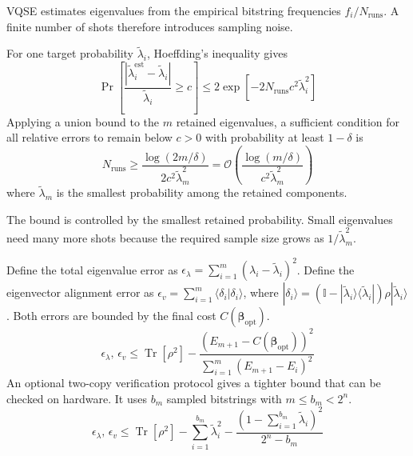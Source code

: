 VQSE estimates eigenvalues from the empirical bitstring frequencies $f_i/N_{\text{runs}}$.  A finite number of shots therefore introduces sampling noise.

\begin{theorem}
    For one target probability $\tilde{\lambda}_i$, Hoeffding's inequality gives
    \begin{equation}
        \Pr\!\left[
            \frac{|\tilde{\lambda}_i^{\mathrm{est}}-\tilde{\lambda}_i|}{\tilde{\lambda}_i}
            \geq c\right]
        \leq 2\exp\!\left[-2N_{\mathrm{runs}}c^2\tilde{\lambda}_i^2\right]
    \end{equation}
    Applying a union bound to the $m$ retained eigenvalues, a sufficient condition for all relative errors to remain below $c>0$ with probability at least $1-\delta$ is
    \begin{equation}
        N_{\text{runs}}
        \geq\frac{\log(2m/\delta)}{2c^2\tilde{\lambda}_m^2}
        =\mathcal{O}\!\left(\frac{\log(m/\delta)}{c^2\tilde{\lambda}_m^2}\right)
        \label{eq:shot_scaling}
    \end{equation}
    where $\tilde{\lambda}_m$ is the smallest probability among the retained components.
\end{theorem}

The bound is controlled by the smallest retained probability.  Small eigenvalues need many more shots because the required sample size grows as $1/\tilde{\lambda}_m^2$.

\begin{theorem}
    Define the total eigenvalue error as $\epsilon_\lambda=\sum_{i=1}^m(\lambda_i-\tilde{\lambda}_i)^2$.  Define the eigenvector alignment error as $\epsilon_v=\sum_{i=1}^m\langle\delta_i|\delta_i\rangle$, where $|\delta_i\rangle=(\mathbb{I}-|\tilde{\lambda}_i\rangle\langle\tilde{\lambda}_i|)\rho|\tilde{\lambda}_i\rangle$.  Both errors are bounded by the final cost $C(\boldsymbol{\beta}_{\mathrm{opt}})$.
    \begin{equation}
        \epsilon_\lambda, \, \epsilon_v \le \operatorname{Tr}[\rho^2] - \frac{(E_{m+1} - C(\boldsymbol{\beta}_{\mathrm{opt}}))^2}{\sum_{i=1}^m (E_{m+1} - E_i)^2}
        \label{eq:operational_error_bound}
    \end{equation}
    An optional two-copy verification protocol gives a tighter bound that can be checked on hardware.  It uses $b_m$ sampled bitstrings with $m\leq b_m<2^n$.
    \begin{equation}
        \epsilon_\lambda, \, \epsilon_v \le \operatorname{Tr}[\rho^2] - \sum_{i=1}^{b_m} \tilde{\lambda}_i^2 - \frac{\left(1 - \sum_{i=1}^{b_m} \tilde{\lambda}_i\right)^2}{2^n - b_m}
        \label{eq:verification_bound_2copy}
    \end{equation}
\end{theorem}

